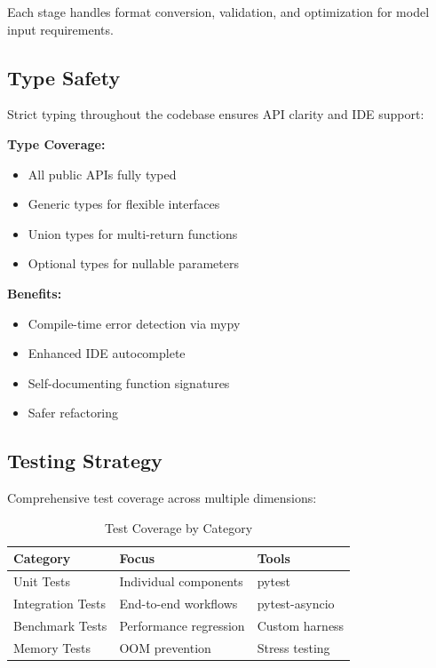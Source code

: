 Each stage handles format conversion, validation, and optimization for model input requirements.

\subsection{Type Safety}

Strict typing throughout the codebase ensures API clarity and IDE support:

\textbf{Type Coverage:}
\begin{itemize}
    \item All public APIs fully typed
    \item Generic types for flexible interfaces
    \item Union types for multi-return functions
    \item Optional types for nullable parameters
\end{itemize}

\textbf{Benefits:}
\begin{itemize}
    \item Compile-time error detection via mypy
    \item Enhanced IDE autocomplete
    \item Self-documenting function signatures
    \item Safer refactoring
\end{itemize}

\subsection{Testing Strategy}

Comprehensive test coverage across multiple dimensions:

\begin{table}[h]
\centering
\caption{Test Coverage by Category}
\label{tab:test_coverage}
\begin{tabular}{lll}
\toprule
\textbf{Category} & \textbf{Focus} & \textbf{Tools} \\
\midrule
Unit Tests & Individual components & pytest \\
Integration Tests & End-to-end workflows & pytest-asyncio \\
Benchmark Tests & Performance regression & Custom harness \\
Memory Tests & OOM prevention & Stress testing \\
\bottomrule
\end{tabular}
\end{table}

